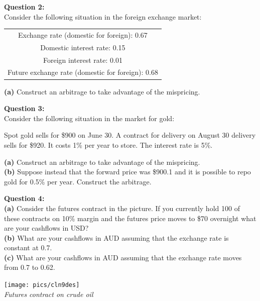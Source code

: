 \medskip

\textbf{Question 2:}\\

Consider the following situation in the foreign exchange market:

\begin{center}
\begin{tabular}{|c|}
\hline
Exchange rate (domestic for foreign): 0.67\\
Domestic interest rate: 0.15\\
Foreign interest rate: 0.01\\
Future exchange rate (domestic for foreign): 0.68\\
\hline
\end{tabular}
\end{center}

\textbf{(a)} Construct an arbitrage to take advantage of the mispricing. 

\medskip

\textbf{Question 3:}\\

Consider the following situation in the market for gold:

Spot gold sells for \$900 on June 30. A contract for delivery on August 30 delivery sells for \$920. It costs 1\% per year to store. The interest rate is 5\%.

\textbf{(a)} Construct an arbitrage to take advantage of the mispricing. \\
\textbf{(b)} Suppose instead that the forward price was \$900.1 and it is possible to repo gold for 0.5\% per year. Construct the arbitrage.

\medskip

\textbf{Question 4:}\\


\textbf{(a)} Consider the futures contract in the picture. If you currently hold 100 of these contracts on 10\% margin and the futures price moves to \$70 overnight what are your cashflows in USD?\\
\textbf{(b)} What are your cashflows in AUD assuming that the exchange rate is constant at 0.7.\\
\textbf{(c)} What are your cashflows in AUD assuming that the exchange rate moves from 0.7 to 0.62.

\begin{center}
  \texttt{[image: pics/cln9des]} \\
  \textit{Futures contract on crude oil}
\end{center}

